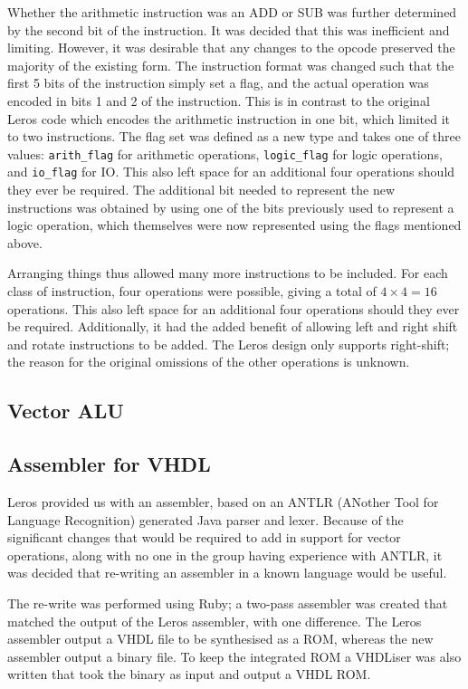 Whether the arithmetic instruction was an ADD or SUB was further determined by
the second bit of the instruction. It was decided that this was inefficient and
limiting. However, it was desirable that any changes to the opcode preserved the
majority of the existing form. The instruction format was changed such that the
first 5 bits of the instruction simply set a flag, and the actual operation was
encoded in bits 1 and 2 of the instruction. This is in contrast to the original
Leros code which encodes the arithmetic instruction in one bit, which limited it
to two instructions. The flag set was defined as a new type and takes one
of three values: \texttt{arith\_flag} for arithmetic operations,
\texttt{logic\_flag} for logic operations, and  \texttt{io\_flag} for IO. This
also left space for an additional four operations should they ever be required.
The additional bit needed to represent the new instructions was obtained by
using one of the bits previously used to represent a logic operation, which
themselves were now represented using the flags mentioned above.

Arranging things thus allowed many more instructions to be included. For each
class of instruction, four operations were possible, giving a total of $4 \times
4 = 16$ operations. This also left space for an additional four operations
should they ever be required. Additionally, it  had the added benefit of
allowing left and right shift and rotate instructions to be added. The Leros
design only supports right-shift; the reason for the original omissions of the other
operations is unknown.



\subsection{Vector ALU}


\subsection{Assembler for VHDL}

  Leros provided us with an assembler, based on an ANTLR (ANother Tool for
  Language Recognition) generated Java parser and lexer.  Because of the
  significant changes that would be required to add in support for vector
  operations, along with no one in the group having experience with ANTLR, it
  was decided that re-writing an assembler in a known language would be useful.

  The re-write was performed using Ruby; a two-pass assembler was created that
  matched the output of the Leros assembler, with one difference.  The
  Leros assembler output a VHDL file to be synthesised as a ROM, whereas the new assembler
  output a binary file.  To keep the integrated ROM a VHDLiser was also written
  that took the binary as input and output a VHDL ROM.
